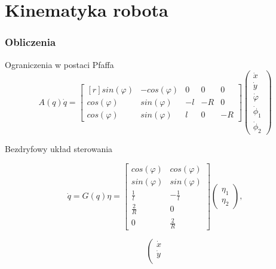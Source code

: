 \section{Kinematyka robota}

\begin{frame}
  	\frametitle{Obliczenia}  
  	\tiny
	\begin{block}{Ograniczenia w postaci Pfaffa}
		\begin{equation*}
			A(q)\dot{q} =
			\begin{bmatrix*}[r]
				sin(\varphi) & -cos(\varphi) & 0  &  0 & 0 \\
				cos(\varphi) & sin(\varphi)  & -l & -R & 0 \\
				cos(\varphi) & sin(\varphi)  & l  &  0 & -R 
			\end{bmatrix*}
			\left(\begin{array}{c}
				\dot{x} \\ \dot{y} \\ \dot{\varphi} \\ \dot{\phi}_1 \\ \dot{\phi}_2
			\end{array}\right)
		\end{equation*}
	\end{block}
	\begin{block}{Bezdryfowy układ sterowania}
		\begin{minipage}{0.49\textwidth}
			\begin{equation*}
			\dot{q} = G(q)\eta =
			\begin{bmatrix*}
			cos(\varphi) & cos(\varphi) \\
			sin(\varphi) & sin(\varphi) \\
			\frac{1}{l} & -\frac{1}{l} \\
			\frac{2}{R} & 0 \\
			0 & \frac{2}{R} 
			\end{bmatrix*}
			\left(\begin{array}{c}
			\eta_1 \\
			\eta_2
			\end{array}\right),
			\end{equation*}
		\end{minipage}
		\begin{minipage}{0.49\textwidth}
			\begin{equation*}
			\left(\begin{array}{c}
			\dot{x} \\
			\dot{y} \\

\end{array}
\end{equation*}
\end{minipage}
\end{block}
\end{frame}
